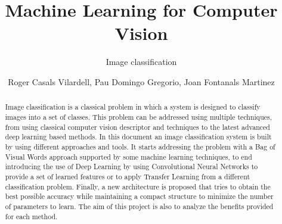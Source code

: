 \documentclass[runningheads]{llncs}
\begin{document}
%
\title{Machine Learning for Computer Vision}
\subtitle{Image classification}
%
%
\author{Roger Casals Vilardell, Pau Domingo Gregorio, Joan Fontanals Martinez}
%
%
%
\maketitle              %
%
\begin{abstract}
Image classification is a classical problem in which a system is designed to classify images into a set of classes. This problem can be addressed using multiple techniques, from using classical computer vision descriptor and techniques to the latest advanced deep learning based methods.
In this document an image classification system is built by using different approaches and tools. It starts addressing the problem with a Bag of Visual Words approach supported by some machine learning techniques, to end introducing the use of Deep Learning by using Convolutional Neural Networks to provide a set of learned features or to apply Transfer Learning from a different classification problem. Finally, a new architecture is proposed that tries to obtain the best possible accuracy while maintaining a compact structure to minimize the number of parameters to learn. The aim of this project is also to analyze the benefits provided for each method.

\end{abstract}
\end{document}
